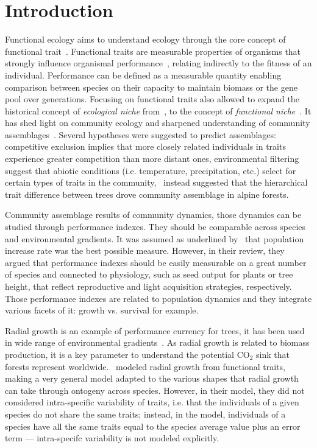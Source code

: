 \label{sec:Intro}
\section*{Introduction}

Functional ecology aims to understand ecology through the core concept of functional trait~\citep{mcgill_rebuilding_2006}. Functional traits are measurable properties of organisms that strongly influence organismal performance~\citep{mcgill_rebuilding_2006}, relating indirectly to the fitness of an individual. Performance can be defined as a measurable quantity enabling comparison between species on their capacity to maintain biomass or the gene pool over generations. Focusing on functional traits also allowed to expand the historical concept of \emph{ecological niche} from~\citet{hutchinson_concluding_1957}, to the concept of \emph{functional niche}~\citep{violle_towards_2009}. It has shed light on community ecology and sharpened understanding of community assemblages~\citep{kraft_functional_2010}. Several hypotheses were suggested to predict assemblages: competitive exclusion implies that more closely related individuals in traits experience greater competition than more distant ones, environmental filtering suggest that abiotic conditions (i.e. temperature, precipitation, etc.) select for certain types of traits in the community,~\citet{kunstler_competitive_2012} instead suggested that the hierarchical trait difference between trees drove community assemblage in alpine forests.

Community assemblage results of community dynamics, those dynamics can be studied through performance indexes. They should be comparable across species and environmental gradients. It was assumed as underlined by~\citet{mcgill_rebuilding_2006} that population increase rate was the best possible measure. However, in their review, they argued that performance indexes should be easily measurable on a great number of species	and connected to physiology, such as seed output for plants or tree height, that reflect reproductive and light acquisition strategies, respectively. Those performance indexes are related to population dynamics and they integrate various facets of it: growth vs. survival for example.

Radial growth is an example of performance currency for trees, it has been used in wide range of environmental gradients~\citep{herault_functional_2011, kunstler_competitive_2012}. As radial growth is related to biomass production, it is a key parameter to understand the potential $\text{CO}_2$ sink that forests represent worldwide.~\citet{herault_functional_2011} modeled radial growth from functional traits, making a very general model adapted to the various shapes that radial growth can take through ontogeny across species. However, in their model, they did not considered intra-specific variability of traits, i.e. that the individuals of a given species do not share the same traits; instead, in the model, individuals of a species have all the same traits equal to the species average value plus an error term — intra-specifc variability is not modeled explicitly.

